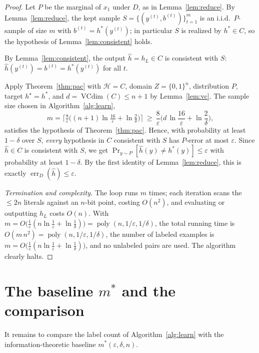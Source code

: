 \documentclass{amsart}
\theoremstyle{definition}
\theoremstyle{remark}
\newcommand{\eps}{\varepsilon}
\DeclareMathOperator{\VCdim}{VCdim}
\DeclareMathOperator*{\err}{err}
\DeclareMathOperator{\poly}{poly}
\begin{document}
\begin{proof}
Let $P$ be the marginal of $x_1$ under $D$, as in Lemma~\ref{lem:reduce}. By
Lemma~\ref{lem:reduce}, the kept sample $S=\{(y^{(t)},b^{(t)})\}_{t=1}^m$ is an
i.i.d.\ $P$-sample of size $m$ with $b^{(t)}=h^*(y^{(t)})$; in particular $S$ is
realized by $h^*\in C$, so the hypothesis of Lemma~\ref{lem:consistent} holds.

By Lemma~\ref{lem:consistent}, the output $\hat h=h_L\in C$ is consistent with
$S$: $\hat h(y^{(t)})=b^{(t)}=h^*(y^{(t)})$ for all $t$.

Apply Theorem~\ref{thm:pac} with $\mathcal H=C$, domain $Z=\{0,1\}^n$,
distribution $P$, target $h^\star=h^*$, and $d=\VCdim(C)\le n+1$ by
Lemma~\ref{lem:vc}. The sample size chosen in Algorithm~\ref{alg:learn},
\[
m=\Big\lceil \tfrac{8}{\eps}\big((n+1)\ln\tfrac{16}{\eps}+\ln\tfrac{2}{\delta}\big)\Big\rceil
\ \ge\ \frac{8}{\eps}\Big(d\,\ln\frac{16}{\eps}+\ln\frac{2}{\delta}\Big),
\]
satisfies the hypothesis of Theorem~\ref{thm:pac}. Hence, with probability at
least $1-\delta$ over $S$, \emph{every} hypothesis in $C$ consistent with $S$
has $P$-error at most $\eps$. Since $\hat h\in C$ is consistent with $S$, we get
$\Pr_{y\sim P}[\hat h(y)\neq h^*(y)]\le\eps$ with probability at least
$1-\delta$. By the first identity of Lemma~\ref{lem:reduce}, this is exactly
$\err_D(\hat h)\le\eps$.

\emph{Termination and complexity.} The loop runs $m$ times; each iteration scans
the $\le 2n$ literals against an $n$-bit point, costing $O(n^2)$, and evaluating
or outputting $h_L$ costs $O(n)$. With
$m=O\big(\tfrac1\eps(n\ln\tfrac1\eps+\ln\tfrac1\delta)\big)=\poly(n,1/\eps,1/\delta)$,
the total running time is $O(m\,n^2)=\poly(n,1/\eps,1/\delta)$, the number of
labeled examples is $m=O\big(\tfrac1\eps(n\ln\tfrac1\eps+\ln\tfrac1\delta)\big)$,
and no unlabeled pairs are used. The algorithm clearly halts.
\end{proof}

\section{The baseline \texorpdfstring{$m^*$}{m*} and the comparison}

It remains to compare the label count of Algorithm~\ref{alg:learn} with the
information-theoretic baseline $m^*(\eps,\delta,n)$.
\end{document}
